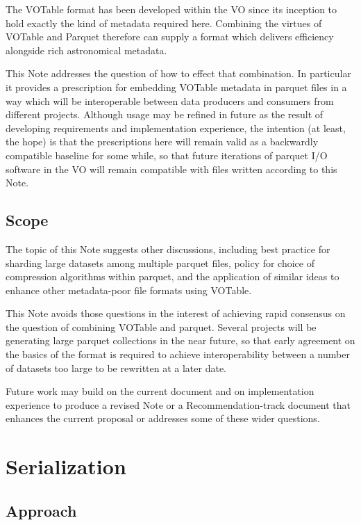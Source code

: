 \documentclass[11pt,a4paper]{ivoa}
\begin{document}
The VOTable format \citep{2019ivoa.spec.1021O}
has been developed within the VO since its
inception to hold exactly the kind of metadata required here.
Combining the virtues of VOTable and Parquet therefore
can supply a format which delivers efficiency alongside
rich astronomical metadata.

This Note addresses the question of how to effect that combination.
In particular it provides a prescription for embedding
VOTable metadata in parquet files in a way which will be interoperable
between data producers and consumers from different projects.
Although usage may be refined in future as the result of
developing requirements and implementation experience,
the intention (at least, the hope) is that the
prescriptions here will remain valid as a backwardly compatible
baseline for some while, so that future iterations of parquet I/O
software in the VO will remain compatible with files written
according to this Note.

\subsection{Scope}
\label{sec:scope}

The topic of this Note suggests other discussions, including
best practice for sharding large datasets among multiple parquet files,
policy for choice of compression algorithms within parquet,
and the application of similar ideas to enhance other metadata-poor
file formats using VOTable.

This Note avoids those questions in the interest of achieving rapid
consensus on the question of combining VOTable and parquet.
Several projects will be generating large parquet collections
in the near future, so that early agreement on the basics of the format
is required to achieve interoperability between a number of
datasets too large to be rewritten at a later date.

Future work may build on the current document and on implementation
experience to produce a revised Note or a Recommendation-track document
that enhances the current proposal or addresses
some of these wider questions.

\section{Serialization}

\subsection{Approach}
\end{document}
